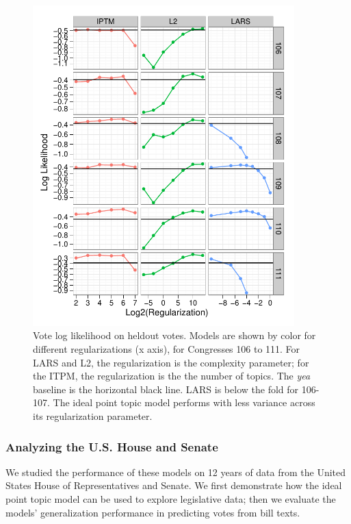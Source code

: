 \begin{figure}
\label{fig:log_likelihood}
\begin{center}
  \includegraphics[width=0.9\textwidth]
{chapter_spatial_voting_with_text/figures/138_log_likelihood_by_session_topics.pdf}
\end{center}
\vspace{-6pt}
\caption{Vote log likelihood on heldout votes. Models are shown
  by color for different regularizations (x axis), for Congresses 106
  to 111.  For LARS and L2, the regularization is the complexity
  parameter; for the ITPM, the regularization is the the number of
  topics.  The \emph{yea} baseline is the horizontal black line. LARS
  is below the fold for 106-107.  The ideal point topic model performs
  with less variance across its regularization parameter. }
\vspace{-3pt}
\end{figure}
\subsubsection*{Analyzing the U.S. House and Senate}
\label{sec:experiments}

We studied the performance of these models on 12 years of data from
the United States House of Representatives and Senate.  We first
demonstrate how the ideal point topic model can be used to explore
legislative data; then we evaluate the models' generalization
performance in predicting votes from bill texts.

